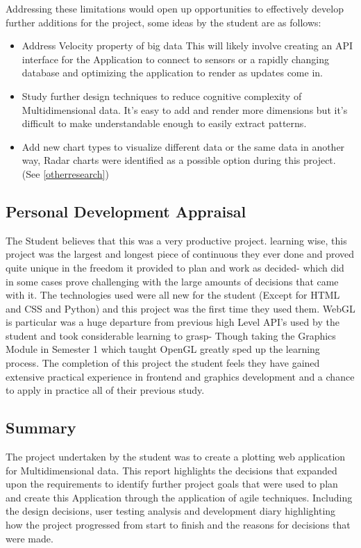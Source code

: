 Addressing these limitations would open up opportunities to effectively develop further additions for the project, some ideas by the student are as follows:

\begin{itemize}
    \item Address Velocity property of big data \cite{7918044} This will likely involve creating an API interface for the Application to connect to sensors or a rapidly changing database and optimizing the application to render as updates come in.
    \item Study further design techniques to reduce cognitive complexity of Multidimensional data. It's easy to add and render more dimensions but it's difficult to make understandable enough to easily extract patterns. \cite{7918044}
    \item Add new chart types to visualize different data or the same data in another way, Radar charts were identified as a possible option during this project. (See \ref{otherresearch})
\end{itemize}

\subsection{Personal Development Appraisal}
The Student believes that this was a very productive project. learning wise, this project was the largest and longest piece of continuous they ever done and proved quite unique in the freedom it provided to plan and work as decided- which did in some cases prove challenging with the large amounts of decisions that came with it. The technologies used were all new for the student (Except for HTML and CSS and Python) and this project was the first time they used them. WebGL is particular was a huge departure from previous high Level API's used by the student and took considerable learning to grasp- Though taking the Graphics Module in Semester 1 which taught OpenGL greatly sped up the learning process.
The completion of this project the student feels they have gained extensive practical experience in frontend and graphics development and a chance to apply in practice all of their previous study.

\subsection{Summary}
The project undertaken by the student was to create a plotting web application for Multidimensional data. This report highlights the decisions that expanded upon the requirements to identify further project goals that were used to plan and create this Application through the application of agile techniques. Including the design decisions, user testing analysis and development diary highlighting how the project progressed from start to finish and the reasons for decisions that were made.